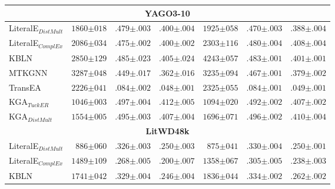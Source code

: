 \begin{table*}[]
\begin{center}
\begin{tabular}{l|rll|rll}
\hline \multicolumn{7}{c}{\textbf{YAGO3-10}} \\ \hline 
LiteralE$_{DistMult}$& $1860{\scriptstyle \pm 018}$ & $.479{\scriptstyle \pm .003}$ & $.400{\scriptstyle \pm .004}$ & $1925{\scriptstyle \pm 058}$ & $.470{\scriptstyle \pm .003}$ & $.388{\scriptstyle \pm .004}$  \\ 
LiteralE$_{ComplEx}$& $2086{\scriptstyle \pm 034}$ & $.475{\scriptstyle \pm .002}$ & $.400{\scriptstyle \pm .002}$ & $2303{\scriptstyle \pm 116}$ & $.480{\scriptstyle \pm .004}$ & $.408{\scriptstyle \pm .004}$  \\ 
KBLN& $2850{\scriptstyle \pm 129}$ & $.485{\scriptstyle \pm .023}$ & $.405{\scriptstyle \pm .024}$ & $4243{\scriptstyle \pm 057}$ & $.483{\scriptstyle \pm .001}$ & $.401{\scriptstyle \pm .001}$  \\ 
MTKGNN& $3287{\scriptstyle \pm 048}$ & $.449{\scriptstyle \pm .017}$ & $.362{\scriptstyle \pm .016}$ & $3235{\scriptstyle \pm 094}$ & $.467{\scriptstyle \pm .001}$ & $.379{\scriptstyle \pm .002}$  \\ 
TransEA& $2226{\scriptstyle \pm 041}$ & $.084{\scriptstyle \pm .002}$ & $.048{\scriptstyle \pm .001}$ & $2325{\scriptstyle \pm 055}$ & $.084{\scriptstyle \pm .001}$ & $.049{\scriptstyle \pm .001}$  \\ 
KGA$_{TuckER}$& $1046{\scriptstyle \pm 003}$ & $.497{\scriptstyle \pm .004}$ & $.412{\scriptstyle \pm .005}$ & $1094{\scriptstyle \pm 020}$ & $.492{\scriptstyle \pm .002}$ & $.407{\scriptstyle \pm .002}$  \\ 
KGA$_{DistMult}$& $1554{\scriptstyle \pm 005}$ & $.495{\scriptstyle \pm .003}$ & $.407{\scriptstyle \pm .004}$ & $1696{\scriptstyle \pm 071}$ & $.496{\scriptstyle \pm .002}$ & $.410{\scriptstyle \pm .004}$  \\ 
\hline \multicolumn{7}{c}{\textbf{LitWD48k}} \\ \hline 
LiteralE$_{DistMult}$& $886{\scriptstyle \pm 060}$ & $.326{\scriptstyle \pm .003}$ & $.250{\scriptstyle \pm .003}$ & $875{\scriptstyle \pm 041}$ & $.330{\scriptstyle \pm .004}$ & $.250{\scriptstyle \pm .001}$  \\ 
LiteralE$_{ComplEx}$& $1489{\scriptstyle \pm 109}$ & $.268{\scriptstyle \pm .005}$ & $.200{\scriptstyle \pm .007}$ & $1358{\scriptstyle \pm 067}$ & $.305{\scriptstyle \pm .005}$ & $.238{\scriptstyle \pm .003}$  \\ 
KBLN& $1741{\scriptstyle \pm 042}$ & $.329{\scriptstyle \pm .004}$ & $.246{\scriptstyle \pm .004}$ & $1836{\scriptstyle \pm 044}$ & $.334{\scriptstyle \pm .002}$ & $.262{\scriptstyle \pm .002}$  \\ 

\end{tabular}
\end{center}
\end{table*}
